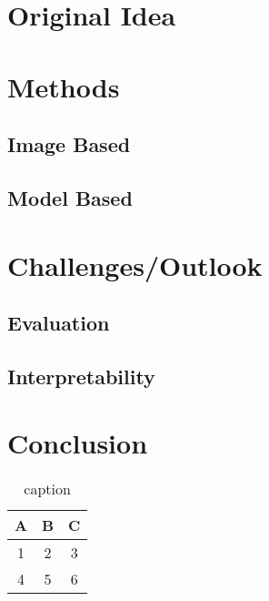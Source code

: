 \documentclass{seminar}
\begin{document}
	\section{Original Idea}
	
	\section{Methods}
	\subsection{Image Based}
	\subsection{Model Based}
	
	\section{Challenges/Outlook}
	\subsection{Evaluation}
	\subsection{Interpretability}
	
	
	
	
	
	
	\section{Conclusion}
	
	
	
	
	
	\begin{table}
		\caption{caption}
		\begin{tabular}{|c|c|c|}
			\hline
			A & B & C \\
			\hline
			1 & 2 & 3  \\
			\hline 
			4 & 5 & 6 \\
			\hline
		\end{tabular}
	\end{table}
	
	
	\newpage
	
	
	
	
	
	
\end{document}
